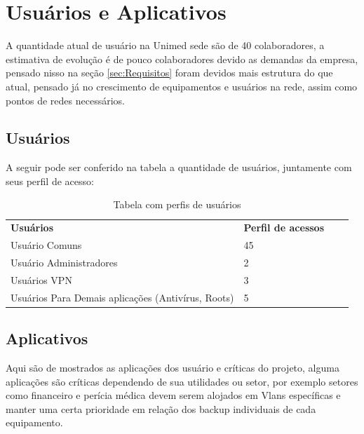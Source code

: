 \documentclass[	DIV=calc,%
							paper=a4,%
							fontsize=12pt,%
							onecolumn]{scrartcl}	 					%
\begin{document}
\section{Usuários e Aplicativos}
A quantidade atual de usuário na Unimed sede são de 40 colaboradores, a estimativa de evolução é de pouco colaboradores devido as demandas da empresa, pensado nisso na seção \ref{sec:Requisitos} foram devidos mais estrutura do que atual, pensado já no crescimento de equipamentos e usuários na rede, assim como pontos de redes necessários. 

\subsection{Usuários}
	A seguir pode ser conferido na tabela a quantidade de usuários, juntamente com seus perfil de acesso:
	\begin{table}[!htbp]
		\centering
		\begin{tabular}{|l|l|ll} 
			\cline{1-2}
			\textbf{Usuários}                                  & \textbf{Perfil de acessos} &  &   \\ 
			\cline{1-2}
			Usuário Comuns                                     & 45                         &  &   \\
			Usuário Administradores                            & 2                          &  &   \\
			Usuários VPN                                       & 3                          &  &   \\
			Usuários Para Demais aplicações (Antivírus, Roots) & 5                          &  &   \\
			\cline{1-2}
		\end{tabular}
		\caption{Tabela com perfis de usuários}\label{tab:usuarios}
	\end{table}

\subsection{Aplicativos}
Aqui são de mostrados as aplicações dos usuário e críticas do projeto, alguma aplicações são críticas dependendo de sua utilidades ou setor, por exemplo setores como financeiro e perícia médica devem serem alojados em Vlans específicas e manter uma certa prioridade em relação dos backup individuais de cada equipamento. 
\end{document}
